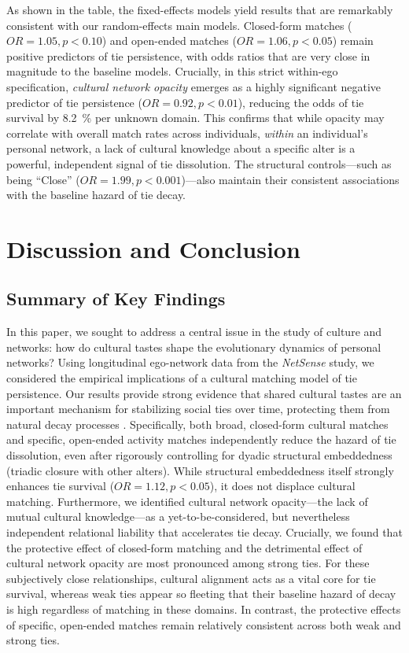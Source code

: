 \documentclass[
  letterpaper,
  DIV=11,
  numbers=noendperiod]{scrartcl}
\def\percent{\%}%
\begin{document}
As shown in the table, the fixed-effects models yield results that are remarkably consistent with our random-effects main models. Closed-form matches ($OR = 1.05, p < 0.10$) and open-ended matches ($OR = 1.06, p < 0.05$) remain positive predictors of tie persistence, with odds ratios that are very close in magnitude to the baseline models. Crucially, in this strict within-ego specification, \textit{cultural network opacity} emerges as a highly significant negative predictor of tie persistence ($OR = 0.92, p < 0.01$), reducing the odds of tie survival by \SI{8.2}{\percent} per unknown domain. This confirms that while opacity may correlate with overall match rates across individuals, \textit{within} an individual's personal network, a lack of cultural knowledge about a specific alter is a powerful, independent signal of tie dissolution. The structural controls---such as being ``Close'' ($OR = 1.99, p < 0.001$)---also maintain their consistent associations with the baseline hazard of tie decay.



\section{Discussion and Conclusion}\label{discussion}

\subsection{Summary of Key Findings}
In this paper, we sought to address a central issue in the study of culture and networks: how do cultural tastes shape the evolutionary dynamics of personal networks? Using longitudinal ego-network data from the \textit{NetSense} study, we considered the empirical implications of a cultural matching model of tie persistence. Our results provide strong evidence that shared cultural tastes are an important mechanism for stabilizing social ties over time, protecting them from natural decay processes \citep{burt2000}. Specifically, both broad, closed-form cultural matches and specific, open-ended activity matches independently reduce the hazard of tie dissolution, even after rigorously controlling for dyadic structural embeddedness (triadic closure with other alters). While structural embeddedness itself strongly enhances tie survival ($OR = 1.12, p < 0.05$), it does not displace cultural matching. Furthermore, we identified cultural network opacity---the lack of mutual cultural knowledge---as a yet-to-be-considered, but nevertheless independent relational liability that accelerates tie decay. Crucially, we found that the protective effect of closed-form matching and the detrimental effect of cultural network opacity are most pronounced among strong ties. For these subjectively close relationships, cultural alignment acts as a vital core for tie survival, whereas weak ties appear so fleeting that their baseline hazard of decay is high regardless of matching in these domains. In contrast, the protective effects of specific, open-ended matches remain relatively consistent across both weak and strong ties.
\end{document}
